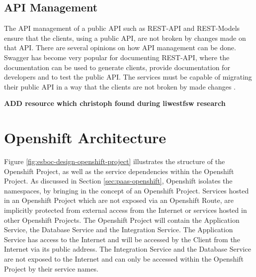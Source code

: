\subsection{API Management}
\label{sec:esboc-requirements-service-api}
The API management of a public API such as REST-API and REST-Models ensure that the clients, using a public API, are not broken by changes made on that API. There are several opinions on how API management can be done. Swagger has become very popular for documenting REST-API, where the documentation can be used to generate clients, provide documentation for developers and to test the public API. The services must be capable of migrating their public API in a way that the clients are not broken by made changes \cite{SmartBearSwagger2018}.

\textbf{ADD resource which christoph found during liwestfsw research} 
\newpage
\section{Openshift Architecture}
\label{sec:esboc-design-oc}
Figure \vref{fig:esboc-design-openshift-project} illustrates the structure of the Openshift Project, as well as the service dependencies within the Openshift Project. As discussed in Section \vref{sec:paas-openshift}, Openshift isolates the namespaces, by bringing in the concept of an Openshift Project. Services hosted in an Openshift Project which are not exposed via an Openshift Route, are implicitly protected from external access from the Internet or services hosted in other Openshift Projects. The Openshift Project will contain the Application Service, the Database Service and the Integration Service. The Application Service has access to the Internet and will be accessed by the Client from the Internet via its public address. The Integration Service and the Database Service are not exposed to the Internet and can only be accessed within the Openshift Project by their service names.

